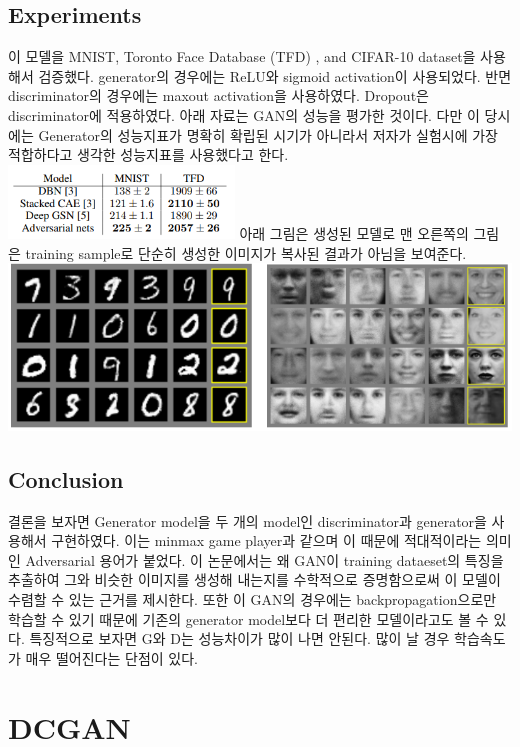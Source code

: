 \documentclass[extendedabs]{bmvc2k}
\begin{document}
 \subsection{Experiments}
 \quad 이 모델을 MNIST, Toronto Face Database (TFD) , and CIFAR-10 dataset을 사용해서 검증했다. 
 generator의 경우에는 ReLU와 sigmoid activation이 사용되었다. 반면 discriminator의 경우에는 maxout activation을 사용하였다.
 Dropout은 discriminator에 적용하였다. 아래 자료는 GAN의 성능을 평가한 것이다. 다만 이 당시에는 
 Generator의 성능지표가 명확히 확립된 시기가 아니라서 저자가 실험시에 가장 적합하다고 생각한 성능지표를 사용했다고 한다.
 \newline  \includegraphics[width=6cm]{images/08_GAN.PNG}
 \newline 아래 그림은 생성된 모델로 맨 오른쪽의 그림은 training sample로 단순히 생성한 이미지가 복사된 결과가 아님을 보여준다.
 \newline  \includegraphics[width=\linewidth]{images/09_GAN.PNG}

 \subsection{Conclusion}
 \quad 결론을 보자면 Generator model을 두 개의 model인 discriminator과 generator을 사용해서 구현하였다. 이는 minmax game player과 같으며 이 때문에 
 적대적이라는 의미인 Adversarial 용어가 붙었다. 이 논문에서는 왜 GAN이 training dataeset의 특징을 추출하여 그와 비슷한 이미지를 생성해 내는지를 수학적으로 증명함으로써
 이 모델이 수렴할 수 있는 근거를 제시한다. 또한 이 GAN의 경우에는 backpropagation으로만 학습할 수 있기 때문에 기존의 generator model보다 더 편리한 모델이라고도 볼 수 있다.
 특징적으로 보자면 G와 D는 성능차이가 많이 나면 안된다. 많이 날 경우 학습속도가 매우 떨어진다는 단점이 있다.

 \section{DCGAN\cite{radford2015unsupervised}}
\end{document}

